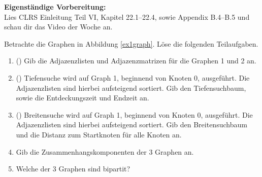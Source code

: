 \documentclass{uebung_cs}
\begin{document}
\textbf{Eigenständige Vorbereitung:}\\
Lies  CLRS Einleitung Teil VI, Kapitel 22.1--22.4, sowie Appendix B.4--B.5 und schau dir das  Video der Woche an.

\begin{aufgabe}\label{tue-first}
	Betrachte die Graphen in Abbildung \ref{ex1graph}.
	Löse die folgenden Teilaufgaben.
	\begin{enumerate}
		\item (\warmup) Gib die Adjazenzlisten und Adjazenzmatrizen für die Graphen 1 und 2 an.
		\item (\warmup) Tiefensuche wird auf Graph 1, beginnend von Knoten 0, ausgeführt.
		Die Adjazenzlisten sind hierbei aufsteigend sortiert.
		Gib den Tiefensuchbaum, sowie die Entdeckungszeit und Endzeit an.
		\item (\warmup) Breitensuche wird auf Graph 1, beginnend von Knoten 0, ausgeführt.
		Die Adjazenzlisten sind hierbei aufsteigend sortiert.
		Gib den Breitensuchbaum und die Distanz zum Startknoten für alle Knoten an.
		\item Gib die Zusammenhangskomponenten der 3 Graphen an.
		\item Welche der 3 Graphen sind bipartit?
	\end{enumerate}
\end{aufgabe}
\end{document}
